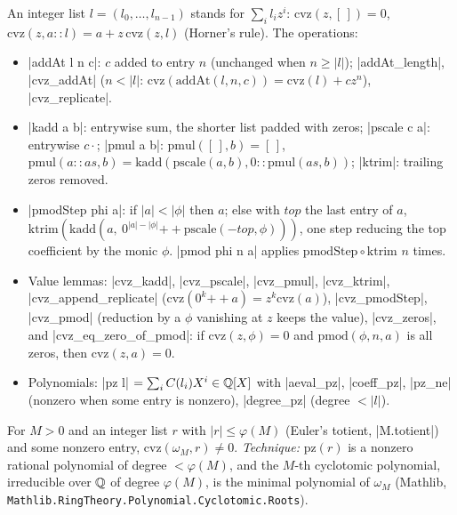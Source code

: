 An integer list $l=(l_0,\dots,l_{n-1})$ stands for $\sum_il_i z^i$:
$\mathrm{cvz}(z,[\,])=0$, $\mathrm{cvz}(z,a{::}l)=a+z\,\mathrm{cvz}(z,l)$ (Horner's rule). The
operations:
\begin{itemize}
\item \lean|addAt l n c|: $c$ added to entry $n$ (unchanged when $n\ge|l|$); \lean|addAt_length|,
  \lean|cvz_addAt| ($n<|l|$: $\mathrm{cvz}(\mathrm{addAt}(l,n,c))=\mathrm{cvz}(l)+cz^n$),
  \lean|cvz_replicate|.
\item \lean|kadd a b|: entrywise sum, the shorter list padded with zeros; \lean|pscale c a|:
  entrywise $c\cdot$; \lean|pmul a b|: $\mathrm{pmul}([\,],b)=[\,]$,
  $\mathrm{pmul}(a{::}as,b)=\mathrm{kadd}(\mathrm{pscale}(a,b),0{::}\mathrm{pmul}(as,b))$;
  \lean|ktrim|: trailing zeros removed.
\item \lean|pmodStep phi a|: if $|a|<|\phi|$ then $a$; else with $top$ the last entry of $a$,
  $\mathrm{ktrim}(\mathrm{kadd}(a,\ 0^{|a|-|\phi|}\mathbin{+\!\!+}\mathrm{pscale}(-top,\phi)))$, one step reducing
  the top coefficient by the monic $\phi$. \lean|pmod phi n a| applies $\mathrm{pmodStep}\circ\mathrm{ktrim}$
  $n$ times.
\item Value lemmas: \lean|cvz_kadd|, \lean|cvz_pscale|, \lean|cvz_pmul|, \lean|cvz_ktrim|,
  \lean|cvz_append_replicate| ($\mathrm{cvz}(0^k\mathbin{+\!\!+}a)=z^k\mathrm{cvz}(a)$),
  \lean|cvz_pmodStep|, \lean|cvz_pmod| (reduction by a $\phi$ vanishing at $z$ keeps the value),
  \lean|cvz_zeros|, and \lean|cvz_eq_zero_of_pmod|: if $\mathrm{cvz}(z,\phi)=0$ and
  $\mathrm{pmod}(\phi,n,a)$ is all zeros, then $\mathrm{cvz}(z,a)=0$.
\item Polynomials: \lean|pz l| $=\sum_iC(l_i)X^i\in\mathbb{Q}[X]$ with \lean|aeval_pz|, \lean|coeff_pz|,
  \lean|pz_ne| (nonzero when some entry is nonzero), \lean|degree_pz| (degree $<|l|$).
\end{itemize}

\begin{theorem}
For $M>0$ and an integer list $r$ with $|r|\le\varphi(M)$ (Euler's totient, \lean|M.totient|) and some
nonzero entry, $\mathrm{cvz}(\omega_M,r)\ne0$. \emph{Technique:} $\mathrm{pz}(r)$ is a nonzero rational
polynomial of degree $<\varphi(M)$, and the $M$-th cyclotomic polynomial, irreducible over $\mathbb{Q}$ of
degree $\varphi(M)$, is the minimal polynomial of $\omega_M$ (Mathlib,
\nolinkurl{Mathlib.RingTheory.Polynomial.Cyclotomic.Roots}).
\end{theorem}

